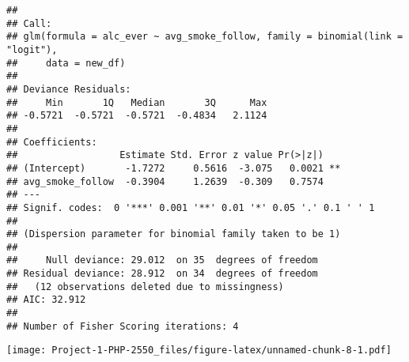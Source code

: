 \documentclass[
]{article}
\newenvironment{Shaded}{\begin{snugshade}}{\end{snugshade}}
\newcommand{\AttributeTok}[1]{\textcolor[rgb]{0.13,0.29,0.53}{#1}}
\newcommand{\CommentTok}[1]{\textcolor[rgb]{0.56,0.35,0.01}{\textit{#1}}}
\newcommand{\FunctionTok}[1]{\textcolor[rgb]{0.13,0.29,0.53}{\textbf{#1}}}
\newcommand{\NormalTok}[1]{#1}
\newcommand{\OtherTok}[1]{\textcolor[rgb]{0.56,0.35,0.01}{#1}}
\newcommand{\SpecialCharTok}[1]{\textcolor[rgb]{0.81,0.36,0.00}{\textbf{#1}}}
\newcommand{\StringTok}[1]{\textcolor[rgb]{0.31,0.60,0.02}{#1}}
\begin{document}
\begin{verbatim}
## 
## Call:
## glm(formula = alc_ever ~ avg_smoke_follow, family = binomial(link = "logit"), 
##     data = new_df)
## 
## Deviance Residuals: 
##     Min       1Q   Median       3Q      Max  
## -0.5721  -0.5721  -0.5721  -0.4834   2.1124  
## 
## Coefficients:
##                  Estimate Std. Error z value Pr(>|z|)   
## (Intercept)       -1.7272     0.5616  -3.075   0.0021 **
## avg_smoke_follow  -0.3904     1.2639  -0.309   0.7574   
## ---
## Signif. codes:  0 '***' 0.001 '**' 0.01 '*' 0.05 '.' 0.1 ' ' 1
## 
## (Dispersion parameter for binomial family taken to be 1)
## 
##     Null deviance: 29.012  on 35  degrees of freedom
## Residual deviance: 28.912  on 34  degrees of freedom
##   (12 observations deleted due to missingness)
## AIC: 32.912
## 
## Number of Fisher Scoring iterations: 4
\end{verbatim}

\begin{Shaded}
\end{Shaded}

\texttt{[image: Project-1-PHP-2550\_files/figure-latex/unnamed-chunk-8-1.pdf]}
\end{document}
